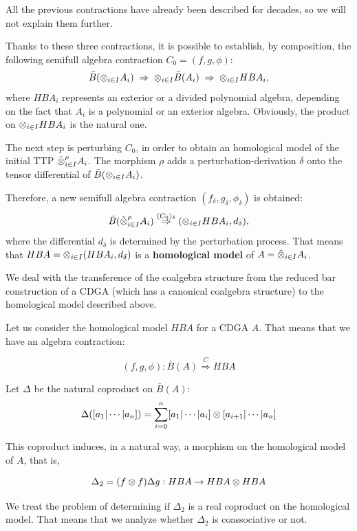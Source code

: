 All the previous contractions have already been described for
decades, so we will not explain them further.


Thanks to these three contractions, it is possible to establish, by
composition, the following semifull algebra contraction $C_0 =(f,
g, \phi)$:
$$\bar{B}(\otimes_{i\in I} A_i) \; \Rightarrow \; \otimes_{i\in I} \bar{B}(A_i) \;
\Rightarrow \; \otimes_{i\in I} HBA_i,$$
where $HBA_i$ represents an exterior or a divided polynomial algebra,
depending on the fact that $A_i$ is a polynomial or an exterior algebra.
Obviously, the product on $\otimes_{i \in I} HBA_i$ is the natural one.


The next step is perturbing $C_0$, in order to obtain an homological model
of the initial TTP $\tilde{\otimes}^{\rho}_{i\in I} A_i$. The morphism $\rho$
adds a perturbation-derivation $\delta$ onto the tensor
differential of $\bar{B}(\otimes_{i \in I} A_i)$.

Therefore, a new semifull algebra
contraction $(f_{\delta},g_{\delta},\phi_{\delta})$ is obtained:
$$\bar{B}(\tilde{\otimes}^{\rho}_{i\in
I} A_i) \stackrel{(C_0)_{\delta}} {\Rightarrow} (\otimes_{i \in I}
HBA_i,d_{\delta}),$$
where the differential $d_{\delta}$ is determined by the perturbation
process. That means that $HBA=\otimes_{i \in I} (HBA_i, d_{\delta})$ is a
{\bf homological model} of $A=\tilde{\otimes}_{i \in I} A_i$.

We deal with the transference of the coalgebra
structure from the reduced bar construction of a CDGA
(which has a canonical coalgebra structure) to the
homological model described above.

   Let us consider the homological model $HBA$ for a CDGA
$A$. That means that we have an algebra contraction:

$$(f,g,\phi):\bar{B}(A) \stackrel{C} {\Rightarrow}
HBA$$

Let $\Delta$ be the natural coproduct on $\bar{B}(A)$:
$$\Delta([a_1|\cdots|a_n])=
\sum_{i=0}^{n}[a_1|\cdots|a_i]\otimes[a_{i+1}|\cdots|a_n]$$

This coproduct induces, in a natural way, a morphism on the
homological model of $A$, that is,

\begin{equation}
\label{e1}
\Delta_2=(f\otimes f)\Delta g:HBA \rightarrow HBA\otimes HBA
\end{equation}

We treat the problem of determining if $\Delta_2$
is a real coproduct on the homological
model. That means that we analyze whether $\Delta_2$ is coassociative
or not.

